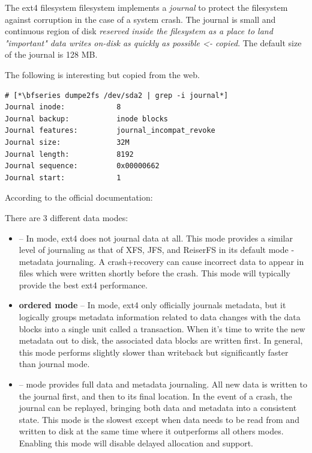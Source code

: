 The ext4 filesystem filesystem implements a \textit{journal} to protect the filesystem against corruption in the case of a system crash. The journal is small and continuous region of disk \textit{reserved inside the filesystem as a place to land "important" data writes on-disk as quickly as possible <- copied}. The default size of the journal is 128 MB.

The following is interesting but copied from the web.

\begin{lstlisting}
# [*\bfseries dumpe2fs /dev/sda2 | grep -i journal*]
Journal inode:            8
Journal backup:           inode blocks
Journal features:         journal_incompat_revoke
Journal size:             32M
Journal length:           8192
Journal sequence:         0x00000662
Journal start:            1
\end{lstlisting}


According to the official documentation:

There are 3 different data modes:

\begin{itemize} 
	\item {} --  In  mode, ext4 does not journal data at all. This mode provides a 
		similar level of journaling as that of XFS, JFS, and ReiserFS in its default mode - metadata journaling. 
		A crash+recovery can cause incorrect data to appear in files which were written shortly before the crash. 
		This mode will typically provide the best ext4 performance.
	\item \textbf{ordered mode} --  In  mode, ext4 only officially journals metadata, but it logically 
	groups metadata information related to data changes with the data blocks into a single unit called a transaction. 
	When it's time to write the new metadata out to disk, the associated data blocks are written first. In general, this 
	mode performs slightly slower than writeback but significantly faster than journal mode.
	\item {} --   mode provides full data and metadata journaling. All new data is written to 
	the journal first, and then to its final location. In the event of a crash, the journal can be replayed, bringing both data 
	and metadata into a consistent state. This mode is the slowest except when data needs to be read from and written 
	to disk at the same time where it outperforms all others modes. Enabling this mode will disable delayed allocation 
	and  support.
\end{itemize} 

